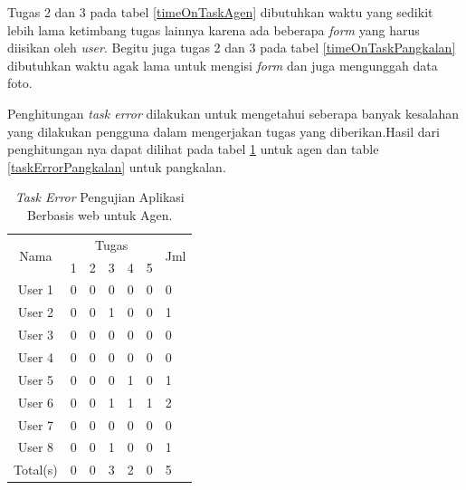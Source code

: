 Tugas 2 dan 3 pada tabel \ref{timeOnTaskAgen} dibutuhkan waktu yang sedikit lebih lama ketimbang tugas lainnya karena ada beberapa \textit{form} yang harus diisikan oleh \textit{user}. Begitu juga tugas 2 dan 3 pada tabel \ref{timeOnTaskPangkalan} dibutuhkan waktu agak lama untuk mengisi \textit{form} dan juga mengunggah data foto.

Penghitungan \textit{task error} dilakukan untuk mengetahui seberapa banyak kesalahan yang dilakukan pengguna dalam mengerjakan tugas yang diberikan.Hasil dari penghitungan nya  dapat dilihat pada tabel \ref{taskErrorAgen} untuk agen dan table \ref{taskErrorPangkalan} untuk pangkalan. 
\begin{table}[H]
	\center
	\caption{\textit{Task Error} Pengujian Aplikasi Berbasis web untuk Agen.}
	\label{taskErrorAgen}
	\begin{tabular}{|c|l|l|l|l|l|l|}
		\hline
		\multirow{2}{*}{Nama} & \multicolumn{5}{c|}{Tugas} &  \multirow{2}{0.5cm}{Jml} \\ \cline{2-6} 
		&1 &2  &3 &4 &5& \\
		\hline
		User 1 &0 &0 &0 &0 &0 &0 \\ 
		\hline
		User 2 &0 &0 &1 &0 &0 &1  \\ 
		\hline
		User 3 &0 &0 &0 &0 &0 &0  \\ 
		\hline
		User 4 &0 &0 &0 &0 &0 &0  \\ 
		\hline
		User 5 &0 &0 &0 &1 &0 &1  \\ 
		\hline
		User 6 &0 &0 &1 &1 &1 &2  \\ 
		\hline
		User 7 &0 &0 &0 &0 &0 &0 \\ 
		\hline
		User 8 &0 &0 &1 &0 &0 &1 \\ 
		\hline
		Total(s)  &0 &0 &3 &2 &0 &5 \\ 
		\hline
	\end{tabular}
\end{table}

